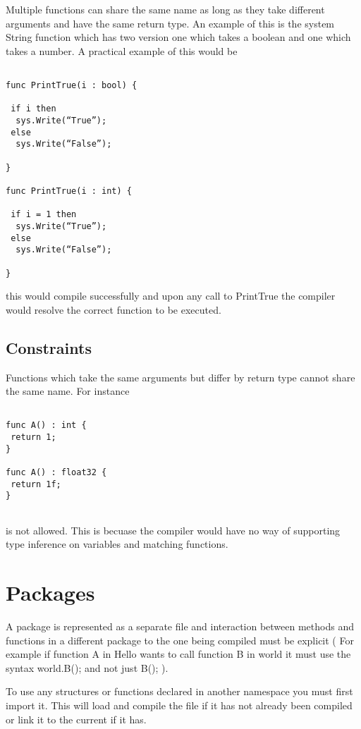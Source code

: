 \documentclass[]{final_report}
\begin{document}
Multiple functions can share the same name as long as they take different arguments and have the same return type. An example of this is the system String function which has two version one which takes a boolean and one which takes a number. A practical example of this would be

\begin{verbatim}

func PrintTrue(i : bool) {

 if i then 
  sys.Write(“True”); 
 else 
  sys.Write(“False”);

}

func PrintTrue(i : int) {

 if i = 1 then
  sys.Write(“True”);
 else
  sys.Write(“False”);

}

\end{verbatim}

this would compile successfully and upon any call to PrintTrue the compiler would resolve the correct function to be executed.

\subsection{Constraints}

Functions which take the same arguments but differ by return type cannot share the same name. For instance

\begin{verbatim}

func A() : int {
 return 1;
}

func A() : float32 {
 return 1f;
}
 
\end{verbatim}

is not allowed. This is becuase the compiler would have no way of supporting type inference on variables and matching functions.

\section{Packages}

A package is represented as a separate file and interaction between methods and functions in a different package to the one being compiled must be explicit ( For example if function A in Hello wants to call function B in world it must use the syntax world.B(); and not just B(); ).

To use any structures or functions declared in another namespace you must first import it. This will load and compile the file if it has not already been compiled or link it to the current if it has.
\end{document}
